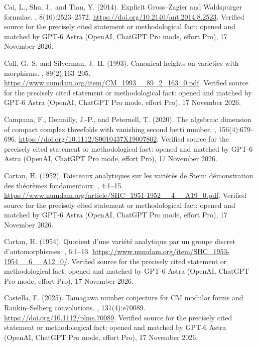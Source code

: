 \begin{thebibliography}{}
Cai, L., Shu, J., and Tian, Y. (2014).
\newblock Explicit {Gross--Zagier} and {Waldspurger} formulae.
, 8(10):2523--2572.
\newblock \url{https://doi.org/10.2140/ant.2014.8.2523}. Verified source for the precisely cited statement or methodological fact: opened and matched by GPT-6 Astra (OpenAI, ChatGPT Pro mode, effort Pro), 17 November 2026.

Call, G.~S. and Silverman, J.~H. (1993).
\newblock Canonical heights on varieties with morphisms.
, 89(2):163--205.
\newblock \url{https://www.numdam.org/item/CM_1993__89_2_163_0.pdf}. Verified source for the precisely cited statement or methodological fact: opened and matched by GPT-6 Astra (OpenAI, ChatGPT Pro mode, effort Pro), 17 November 2026.

Campana, F., Demailly, J.-P., and Peternell, T. (2020).
\newblock The algebraic dimension of compact complex threefolds with vanishing
  second betti number.
, 156(4):679--696.
\newblock \url{https://doi.org/10.1112/S0010437X19007802}. Verified source for the precisely cited statement or methodological fact: opened and matched by GPT-6 Astra (OpenAI, ChatGPT Pro mode, effort Pro), 17 November 2026.

Cartan, H. (1952).
\newblock Faisceaux analytiques sur les vari{\'e}t{\'e}s de {Stein}:
  d{\'e}monstration des th{\'e}or{\`e}mes fondamentaux.
, 4:1--15.
\newblock \url{https://www.numdam.org/article/SHC_1951-1952__4__A19_0.pdf}. Verified source for the precisely cited statement or methodological fact: opened and matched by GPT-6 Astra (OpenAI, ChatGPT Pro mode, effort Pro), 17 November 2026.

Cartan, H. (1954).
\newblock Quotient d'une vari\'{e}t\'{e} analytique par un groupe discret
  d'automorphismes.
, 6:1--13.
\newblock \url{https://www.numdam.org/item/SHC_1953-1954__6__A12_0/}. Verified source for the precisely cited statement or methodological fact: opened and matched by GPT-6 Astra (OpenAI, ChatGPT Pro mode, effort Pro), 17 November 2026.

Castella, F. (2025).
\newblock Tamagawa number conjecture for {CM} modular forms and
  {R}ankin--{S}elberg convolutions.
, 131(4):e70089.
\newblock \url{https://doi.org/10.1112/plms.70089}. Verified source for the precisely cited statement or methodological fact: opened and matched by GPT-6 Astra (OpenAI, ChatGPT Pro mode, effort Pro), 17 November 2026.


\end{thebibliography}
